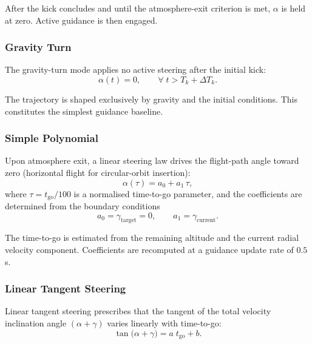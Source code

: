 After the kick concludes and until the atmosphere-exit criterion is met,
$\alpha$ is held at zero.  Active guidance is then engaged.

\subsubsection{Gravity Turn}
\label{sssec:gt}

The gravity-turn mode applies no active steering after the initial kick:
\begin{equation}
  \alpha(t) = 0, \qquad \forall\; t > T_k + \Delta T_k.
  \label{eq:gt}
\end{equation}

The trajectory is shaped exclusively by gravity and the initial conditions.
This constitutes the simplest guidance baseline.

\subsubsection{Simple Polynomial}
\label{sssec:simple_poly}

Upon atmosphere exit, a linear steering law drives the flight-path angle toward
zero (horizontal flight for circular-orbit insertion):
\begin{equation}
  \alpha(\tau) = a_0 + a_1\,\tau,
  \label{eq:simple_poly}
\end{equation}
where $\tau = t_{\text{go}} / 100$ is a normalised time-to-go parameter, and
the coefficients are determined from the boundary conditions
\begin{equation}
  a_0 = \gamma_{\text{target}} = 0, \qquad
  a_1 = \gamma_{\text{current}}.
  \label{eq:simple_poly_bc}
\end{equation}

The time-to-go is estimated from the remaining altitude and the current radial
velocity component.  Coefficients are recomputed at a guidance update rate of
$0.5$\,s.

\subsubsection{Linear Tangent Steering}
\label{sssec:lts}

Linear tangent steering prescribes that the tangent of the total velocity
inclination angle $(\alpha + \gamma)$ varies linearly with time-to-go:
\begin{equation}
  \tan\bigl(\alpha + \gamma\bigr) = a\;t_{\text{go}} + b.
  \label{eq:lts}
\end{equation}

